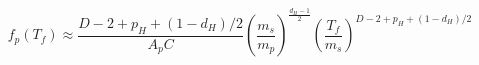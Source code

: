 \begin{equation}f_p(T_f) \approx
\frac{ D-2+p_H +(1-d_H)/2}{A_pC}\left(\frac{m_s}{m_p}\right)^{\frac{d_H-1}{2}}  \left(
\frac{T_f}{m_s} \right )^{ D-2 +p_H +(1-d_H)/2}
\label{finaldensity}
\end{equation}

